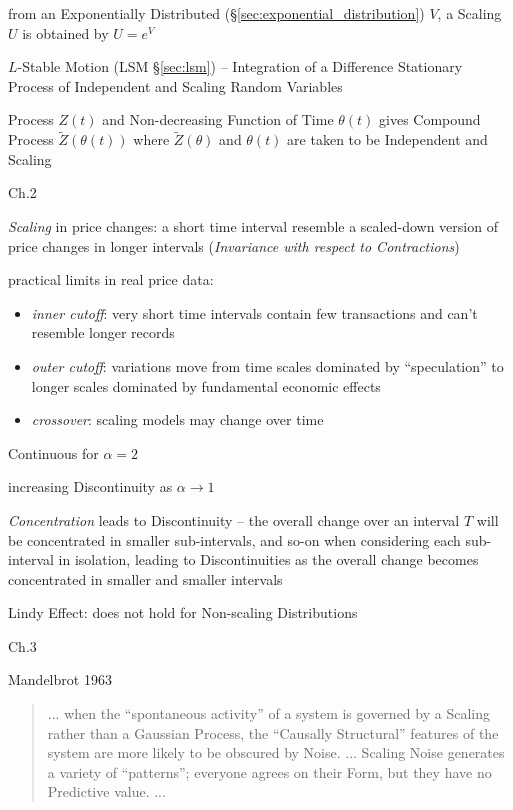 from an Exponentially Distributed (\S\ref{sec:exponential_distribution}) $V$, a
Scaling $U$ is obtained by $U = e^V$

\fist $L$-Stable Motion (LSM \S\ref{sec:lsm}) -- Integration of a Difference
Stationary Process of Independent and Scaling Random Variables

Process $Z(t)$ and Non-decreasing Function of Time $\theta(t)$ gives Compound
Process $\tilde{Z}(\theta(t))$ where $\tilde{Z}(\theta)$ and $\theta(t)$ are
taken to be Independent and Scaling

Ch.2

\emph{Scaling} in price changes: a short time interval resemble a scaled-down
version of price changes in longer intervals (\emph{Invariance with respect to
  Contractions})

practical limits in real price data:
\begin{itemize}
  \item \emph{inner cutoff}: very short time intervals contain few transactions
    and can't resemble longer records
  \item \emph{outer cutoff}: variations move from time scales dominated by
    ``speculation'' to longer scales dominated by fundamental economic effects
  \item \emph{crossover}: scaling models may change over time
\end{itemize}

Continuous for $\alpha = 2$

increasing Discontinuity as $\alpha \to 1$

\emph{Concentration} leads to Discontinuity -- the overall change over an
interval $T$ will be concentrated in smaller sub-intervals, and so-on when
considering each sub-interval in isolation, leading to Discontinuities as the
overall change becomes concentrated in smaller and smaller intervals

Lindy Effect: does not hold for Non-scaling Distributions

Ch.3

Mandelbrot 1963

\begin{quote}
  ... when the ``spontaneous activity'' of a system is governed by a Scaling
  rather than a Gaussian Process, the ``Causally Structural'' features of the
  system are more likely to be obscured by Noise. ... Scaling Noise generates a
  variety of ``patterns''; everyone agrees on their Form, but they have no
  Predictive value. ...
\end{quote}

